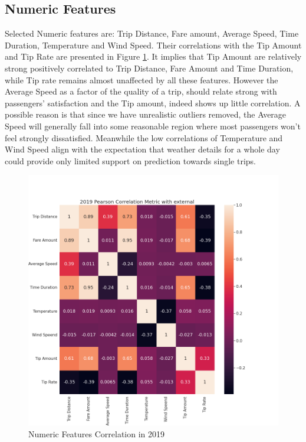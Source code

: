 \documentclass[11pt]{article}
\begin{document}
\subsection{Numeric Features}
Selected Numeric features are: Trip Distance, Fare amount, Average Speed, Time Duration, Temperature and Wind Speed. Their correlations with the Tip Amount and Tip Rate are presented in Figure \ref{fig:2}. It implies that Tip Amount are relatively strong positively correlated to Trip Distance, Fare Amount and Time Duration, while Tip rate remains almost unaffected by all these features. However the Average Speed as a factor of the quality of a trip, should relate strong with passengers' satisfaction and the Tip amount, indeed shows up little correlation. A possible reason is that since we have unrealistic outliers removed, the Average Speed will generally fall into some reasonable region where most passengers won't feel strongly dissatisfied. Meanwhile the low correlations of Temperature and Wind Speed align with the expectation that weather details for a whole day could provide only limited support on prediction towards single trips.
\begin{figure}[h!]
    \centering
     \includegraphics[width=0.6\linewidth, height = 0.5\linewidth]{2019 Pearson Correlation Metric with external.png}
   \caption{Numeric Features Correlation in 2019}
   \label{fig:2}
\end{figure}
\end{document}
